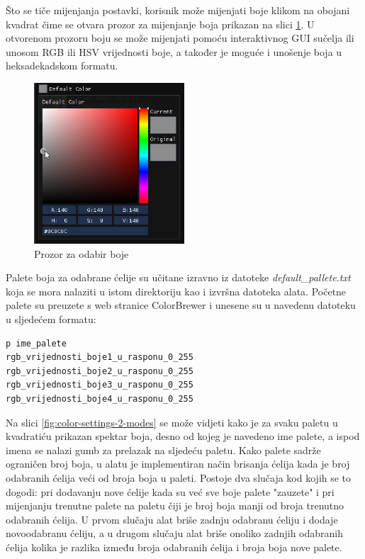 \documentclass[times, utf8, diplomski]{fer}
\begin{document}
Što se tiče mijenjanja postavki, korisnik može mijenjati boje klikom na obojani kvadrat čime se otvara prozor za mijenjanje boja prikazan na slici \ref{fig:color-picker}. U otvorenom prozoru boju se može mijenjati pomoću interaktivnog GUI sučelja ili unosom RGB ili HSV vrijednosti boje, a također je moguće i unošenje boja u heksadekadskom formatu.

\begin{figure} [H]
	\centering
    \includegraphics[width=0.5\textwidth]{color_settings_color_picker.png}
    \caption{Prozor za odabir boje}
    \label{fig:color-picker}
\end{figure}

Palete boja za odabrane ćelije su učitane izravno iz datoteke \textit{default\_pallete.txt} koja se mora nalaziti u istom direktoriju kao i izvršna datoteka alata. Početne palete su preuzete s web stranice ColorBrewer \citep{colorbrewer} i unesene su u navedenu datoteku u sljedećem formatu:

\begin{lstlisting}
p ime_palete
rgb_vrijednosti_boje1_u_rasponu_0_255
rgb_vrijednosti_boje2_u_rasponu_0_255
rgb_vrijednosti_boje3_u_rasponu_0_255
rgb_vrijednosti_boje4_u_rasponu_0_255
\end{lstlisting}

Na slici \ref{fig:color-settings-2-modes} se može vidjeti kako je za svaku paletu u kvadratiću prikazan spektar boja, desno od kojeg je navedeno ime palete, a ispod imena se nalazi gumb za prelazak na sljedeću paletu. Kako palete sadrže ograničen broj boja, u alatu je implementiran način brisanja ćelija kada je broj odabranih ćelija veći od broja boja u paleti. Postoje dva slučaja kod kojih se to dogodi: pri dodavanju nove ćelije kada su već sve boje palete "zauzete" i pri mijenjanju trenutne palete na paletu čiji je broj boja manji od broja trenutno odabranih ćelija. U prvom slučaju alat briše zadnju odabranu ćeliju i dodaje novoodabranu ćeliju, a u drugom slučaju alat briše onoliko zadnjih odabranih ćelija kolika je razlika između broja odabranih ćelija i broja boja nove palete.\\
\end{document}
